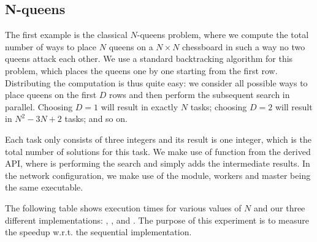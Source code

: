 \documentclass[tfpsymp,pagenumbers]{tfp07symp}
\begin{document}
\subsection{N-queens}\label{sec:n-queens}

The first example is the classical $N$-queens problem, where we
compute the total number of ways to place $N$ queens on a $N\times N$
chessboard in such a way no two queens attack each other.
We use a standard backtracking algorithm for this problem, which
places the queens one by one starting from the first row.
Distributing the computation is thus quite easy: we consider all
possible ways to place queens on the first $D$ rows and then perform
the subsequent search in parallel. Choosing $D=1$ will result in
exactly $N$ tasks; choosing $D=2$ will result in $N^2-3N+2$ tasks; and
so on.

Each task only consists of three integers and its result is one integer,
which is the total number of solutions for this task.
We make use of function  from the derived API,
where  is performing the search and  simply adds the
intermediate results.
In the network configuration, we make use of the 
module, workers and master being the same executable.

The following table shows execution times for various values of $N$
and our three different implementations: , , and
. The purpose of this experiment is to measure the speedup
w.r.t. the sequential implementation.
\end{document}

